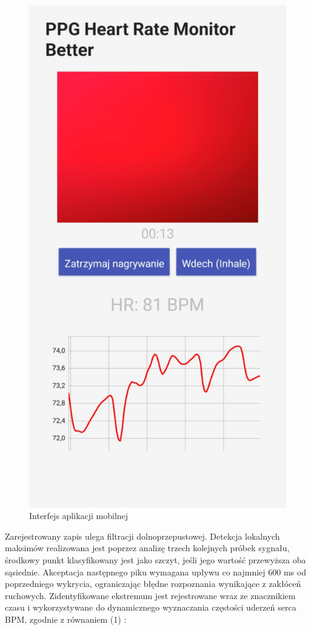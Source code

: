 \documentclass[journal]{IEEEtran}
\begin{document}
\begin{figure}[htbp]
    \centering
    \includegraphics[scale=0.17]{aplikacja.png}
    \caption{Interfejs aplikacji mobilnej}
    \label{fig:aplikacja_mobilna}
\end{figure}

Zarejestrowany zapis ulega filtracji dolnoprzepustowej. Detekcja lokalnych maksimów realizowana jest poprzez analizę trzech kolejnych próbek sygnału, środkowy punkt klasyfikowany jest jako szczyt, jeśli jego wartość przewyższa oba sąsiednie. Akceptacja następnego piku wymagana upływu co najmniej 600 ms od poprzedniego wykrycia, ograniczając błędne rozpoznania wynikające z zakłóceń ruchowych. Zidentyfikowane ekstremum jest rejestrowane wraz ze znacznikiem czasu i wykorzystywane do dynamicznego wyznaczania częstości uderzeń serca BPM, zgodnie z równaniem (1) :
\end{document}
